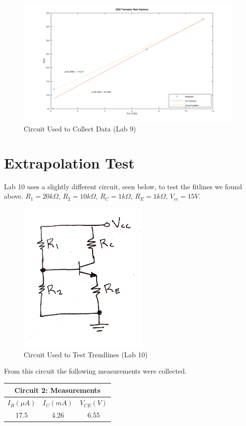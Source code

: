\documentclass[prb,preprint]{revtex4-1}
\begin{document}
\begin{figure}[ht]
	\centering
	\includegraphics[width=6in]{9/bigGraph.png}
	\caption{Circuit Used to Collect Data (Lab 9)}
	\label{fig1}
\end{figure}

\section{Extrapolation Test}
Lab 10 uses a slightly different circuit, seen below, to test the fitlines we found above. $R_{1}=20k\Omega$, $R_{2}=10k\Omega$, $R_{C}=1k\Omega$, $R_{E}=1k\Omega$, $V_{cc}=15V$.


\begin{figure}[ht]
	\centering
	\includegraphics[width=2.5in]{c10.png}
	\caption{Circuit Used to Test Trendlines (Lab 10)}
	\label{fig1}
\end{figure}

From this circuit the following measurements were collected.

\begin{center}
	\begin{tabular}{|c|c|c|}
		\hline
		\multicolumn{3}{|c|}{Circuit 2: Measurements}\\
		\hline
		$I_{B}(\mu A)$ & $I_{C}(mA)$ & $V_{CE}(V)$ \\
		\hline
		17.5 & 4.26 & 6.55 \\
		\hline
	\end{tabular}
\end{center}
\end{document}
